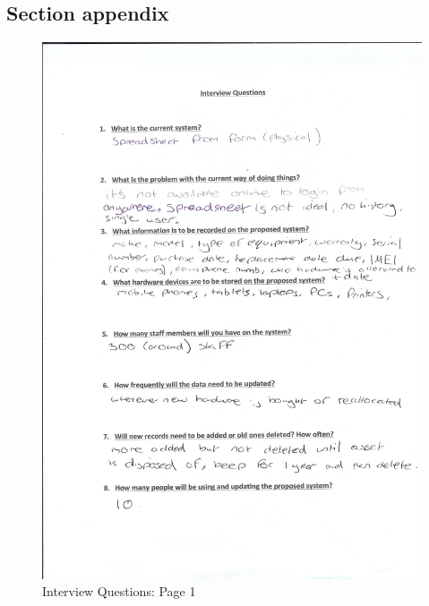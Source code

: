 \subsection{Section appendix}

\begin{figure}[H]
\includegraphics[width=.9\textwidth,height=.9\textheight,keepaspectratio]{Page1Interview.jpg}
\caption{Interview Questions: Page 1} \label{Page1Interview}
\end{figure}

